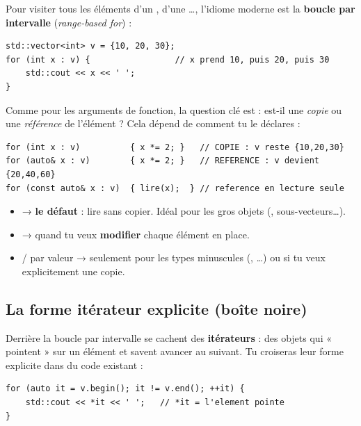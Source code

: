 \documentclass[11pt]{article}
\begin{document}
Pour visiter tous les éléments d'un , d'une
\ldots, l'idiome moderne est la \textbf{boucle  par
intervalle} (\emph{range-based for}) :

\begin{lstlisting}
std::vector<int> v = {10, 20, 30};
for (int x : v) {                 // x prend 10, puis 20, puis 30
    std::cout << x << ' ';
}
\end{lstlisting}

Comme pour les arguments de fonction, la question clé est :  est-il une
\emph{copie} ou une \emph{référence} de l'élément ? Cela dépend de comment tu le
déclares :

\begin{lstlisting}
for (int x : v)          { x *= 2; }   // COPIE : v reste {10,20,30}
for (auto& x : v)        { x *= 2; }   // REFERENCE : v devient {20,40,60}
for (const auto& x : v)  { lire(x);  } // reference en lecture seule
\end{lstlisting}

\begin{aretenir}
\begin{itemize}[noitemsep]
    \item {} → \textbf{le défaut} : lire sans copier. Idéal
          pour les gros objets (, sous-vecteurs\ldots).
    \item {} → quand tu veux \textbf{modifier} chaque élément en
          place.
    \item {} / par valeur → seulement pour les types minuscules
          (, \ldots) ou si tu veux explicitement une copie.
\end{itemize}
\end{aretenir}

\subsection*{La forme itérateur explicite (boîte noire)}

Derrière la boucle par intervalle se cachent des \textbf{itérateurs} : des
objets qui « pointent » sur un élément et savent avancer au suivant. Tu
croiseras leur forme explicite dans du code existant :

\begin{lstlisting}
for (auto it = v.begin(); it != v.end(); ++it) {
    std::cout << *it << ' ';   // *it = l'element pointe
}
\end{lstlisting}
\end{document}
